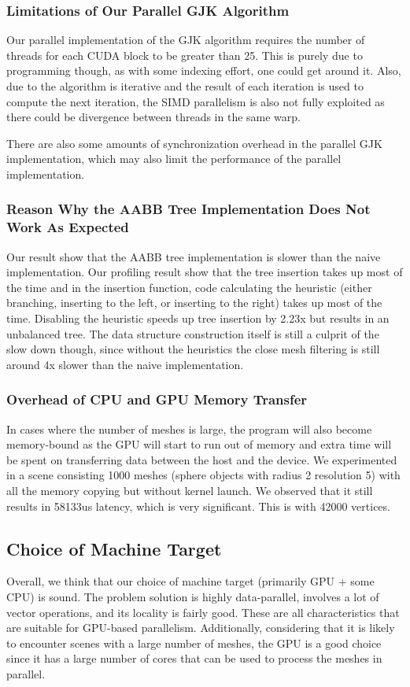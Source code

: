 \documentclass[12pt,fleqn]{article}
\begin{document}
\subsubsection{Limitations of Our Parallel GJK Algorithm}
Our parallel implementation of the GJK algorithm requires the number of threads for each CUDA block to be greater than 25. This is purely due to programming though, as with some indexing effort, one could get around it.
Also, due to the algorithm is iterative and the result of each iteration is used to compute the next iteration, the SIMD parallelism is also not fully exploited as there could be divergence between threads in the same warp.

There are also some amounts of synchronization overhead in the parallel GJK implementation, which may also limit the performance of the parallel implementation.

\subsubsection{Reason Why the AABB Tree Implementation Does Not Work As Expected}
Our result show that the AABB tree implementation is slower than the naive implementation.
Our profiling result show that the tree insertion takes up most of the time and in the insertion function, code calculating the heuristic (either branching, inserting to the left, or inserting to the right) takes up most of the time.
Disabling the heuristic speeds up tree insertion by 2.23x but results in an unbalanced tree. The data structure construction itself is still a culprit of the slow down though, since without the heuristics the close mesh filtering is still around 4x slower than the naive implementation.

\subsubsection{Overhead of CPU and GPU Memory Transfer}
In cases where the number of meshes is large, the program will also become memory-bound as the GPU will start to run out of memory and extra time will be spent on transferring data between the host and the device.
We experimented in a scene consisting 1000 meshes (sphere objects with radius 2 resolution 5) with all the memory copying but without kernel launch.
We observed that it still results in 58133us latency, which is very significant.
This is with 42000 vertices.

\subsection{Choice of Machine Target}
Overall, we think that our choice of machine target (primarily GPU + some CPU) is sound.
The problem solution is highly data-parallel, involves a lot of vector operations, and its locality is fairly good.
These are all characteristics that are suitable for GPU-based parallelism.
Additionally, considering that it is likely to encounter scenes with a large number of meshes, the GPU is a good choice since it has a large number of cores that can be used to process the meshes in parallel.
\end{document}
